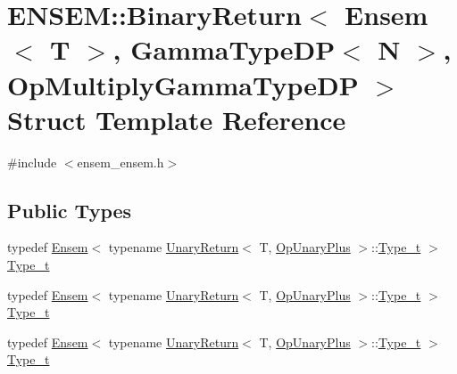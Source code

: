 \hypertarget{structENSEM_1_1BinaryReturn_3_01Ensem_3_01T_01_4_00_01GammaTypeDP_3_01N_01_4_00_01OpMultiplyGammaTypeDP_01_4}{}\section{E\+N\+S\+EM\+:\+:Binary\+Return$<$ Ensem$<$ T $>$, Gamma\+Type\+DP$<$ N $>$, Op\+Multiply\+Gamma\+Type\+DP $>$ Struct Template Reference}
\label{structENSEM_1_1BinaryReturn_3_01Ensem_3_01T_01_4_00_01GammaTypeDP_3_01N_01_4_00_01OpMultiplyGammaTypeDP_01_4}


{\ttfamily \#include $<$ensem\+\_\+ensem.\+h$>$}

\subsection*{Public Types}
\begin{DoxyCompactItemize}
\item 
typedef \mbox{\hyperlink{classENSEM_1_1Ensem}{Ensem}}$<$ typename \mbox{\hyperlink{structENSEM_1_1UnaryReturn}{Unary\+Return}}$<$ T, \mbox{\hyperlink{structENSEM_1_1OpUnaryPlus}{Op\+Unary\+Plus}} $>$\+::\mbox{\hyperlink{structENSEM_1_1BinaryReturn_3_01Ensem_3_01T_01_4_00_01GammaTypeDP_3_01N_01_4_00_01OpMultiplyGammaTypeDP_01_4_a650eb1d413c72965f9b440752c5ba381}{Type\+\_\+t}} $>$ \mbox{\hyperlink{structENSEM_1_1BinaryReturn_3_01Ensem_3_01T_01_4_00_01GammaTypeDP_3_01N_01_4_00_01OpMultiplyGammaTypeDP_01_4_a650eb1d413c72965f9b440752c5ba381}{Type\+\_\+t}}
\item 
typedef \mbox{\hyperlink{classENSEM_1_1Ensem}{Ensem}}$<$ typename \mbox{\hyperlink{structENSEM_1_1UnaryReturn}{Unary\+Return}}$<$ T, \mbox{\hyperlink{structENSEM_1_1OpUnaryPlus}{Op\+Unary\+Plus}} $>$\+::\mbox{\hyperlink{structENSEM_1_1BinaryReturn_3_01Ensem_3_01T_01_4_00_01GammaTypeDP_3_01N_01_4_00_01OpMultiplyGammaTypeDP_01_4_a650eb1d413c72965f9b440752c5ba381}{Type\+\_\+t}} $>$ \mbox{\hyperlink{structENSEM_1_1BinaryReturn_3_01Ensem_3_01T_01_4_00_01GammaTypeDP_3_01N_01_4_00_01OpMultiplyGammaTypeDP_01_4_a650eb1d413c72965f9b440752c5ba381}{Type\+\_\+t}}
\item 
typedef \mbox{\hyperlink{classENSEM_1_1Ensem}{Ensem}}$<$ typename \mbox{\hyperlink{structENSEM_1_1UnaryReturn}{Unary\+Return}}$<$ T, \mbox{\hyperlink{structENSEM_1_1OpUnaryPlus}{Op\+Unary\+Plus}} $>$\+::\mbox{\hyperlink{structENSEM_1_1BinaryReturn_3_01Ensem_3_01T_01_4_00_01GammaTypeDP_3_01N_01_4_00_01OpMultiplyGammaTypeDP_01_4_a650eb1d413c72965f9b440752c5ba381}{Type\+\_\+t}} $>$ \mbox{\hyperlink{structENSEM_1_1BinaryReturn_3_01Ensem_3_01T_01_4_00_01GammaTypeDP_3_01N_01_4_00_01OpMultiplyGammaTypeDP_01_4_a650eb1d413c72965f9b440752c5ba381}{Type\+\_\+t}}
\end{DoxyCompactItemize}


